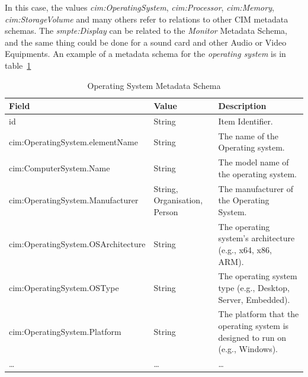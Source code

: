 In this case, the values \textit{cim:OperatingSystem}, \textit{cim:Processor}, \textit{cim:Memory}, \textit{cim:StorageVolume} and many others refer to relations to other CIM metadata schemas. The \textit{smpte:Display} can be related to the \textit{Monitor} Metadata Schema, and the same thing could be done for a sound card and other Audio or Video Equipments.
An example of a metadata schema for the \textit{operating system} is in table~\ref{tab:c4-os}

\begin{longtable}{|p{}|p{}|p{}|}
    \caption{Operating System Metadata Schema} \label{tab:c4-os} \\
    \hline
    \textbf{Field} & \textbf{Value} & \textbf{Description} \\
    \hline

    \scriptsize id                                    & \scriptsize String                         & \scriptsize Item Identifier. \\
    \hline
    \scriptsize cim:OperatingSystem.elementName       & \scriptsize String                         & \scriptsize The name of the Operating system. \\
    \hline
    \scriptsize cim:ComputerSystem.Name               & \scriptsize String                         & \scriptsize The model name of the operating system. \\
    \hline
    \scriptsize cim:OperatingSystem.Manufacturer      & \scriptsize String, \textcolor{uniudColor3}{Organisation}, \textcolor{uniudColor3}{Person}     & \scriptsize The manufacturer of the Operating System. \\
    \hline
    \scriptsize cim:OperatingSystem.OSArchitecture    & \scriptsize String                         & \scriptsize The operating system's architecture (e.g., x64, x86, ARM). \\
    \hline
    \scriptsize cim:OperatingSystem.OSType            & \scriptsize String                         & \scriptsize The operating system type (e.g., Desktop, Server, Embedded). \\
    \hline
    \scriptsize cim:OperatingSystem.Platform          & \scriptsize String                         & \scriptsize The platform that the operating system is designed to run on (e.g., Windows). \\
    \hline
    \scriptsize …                                     & \scriptsize …                              & \scriptsize … \\
    \hline

\end{longtable}

